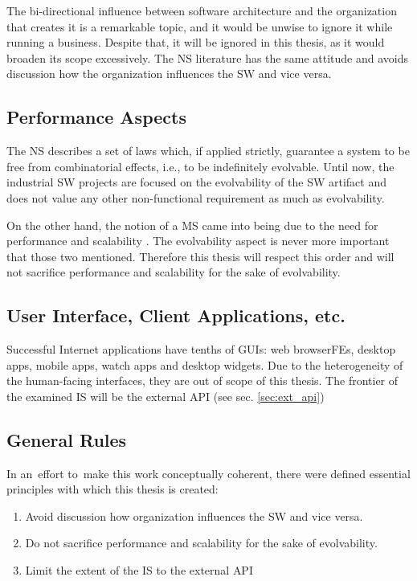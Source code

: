 \documentclass[thesis=M,english,hidelinks]{FITthesis}[2012/10/20]
\begin{document}
The bi-directional influence between software architecture and the organization that creates it is a remarkable topic, and it would be unwise to ignore it while running a business. Despite that, it will be ignored in this thesis, as it would broaden its scope excessively. The \acrshort{NS} literature \cite{ns-recreating, ns-toward-general-theory} has the same attitude and avoids discussion how the organization influences the \acrfull{SW} and vice versa.

\subsection{Performance Aspects}
The \acrlong{NS} describes a set of laws which, if applied strictly, guarantee a system to be free from combinatorial effects, i.e., to be indefinitely evolvable. Until now, the industrial \acrlong{SW} projects \cite{ns-it-isnt-different, ns-exploring-defence} are focused on the evolvability of the \acrshort{SW} artifact and does not value any other non-functional requirement as much as evolvability.

On the other hand, the notion of a \acrfull{MS} came into being due to the need for performance and scalability \cite{ms-building-ms, ms-evolutionary-arch}. The evolvability aspect is never more important that those two mentioned. Therefore this thesis will respect this order and will not sacrifice performance and scalability for the sake of evolvability.

\subsection{User Interface, Client Applications, etc. }
Successful Internet applications have tenths of \acrshort{GUI}s: web browser\acrshort{FE}s, desktop apps, mobile apps, watch apps and desktop widgets. Due to the heterogeneity of the human-facing interfaces, they are out of scope of this thesis. The frontier of the examined \acrfull{IS} will be the external \acrfull{API} (see sec. \ref{sec:ext_api})

\subsection{General Rules}
In an~effort to~make this work conceptually coherent, there were defined essential principles with which this thesis is created:
\begin{enumerate}
    \item Avoid discussion how organization influences the \acrshort{SW} and vice versa.
    \item Do not sacrifice performance and scalability for the sake of evolvability.
    \item Limit the extent of the \acrshort{IS} to the external \acrshort{API} 
\end{enumerate}
\end{document}
